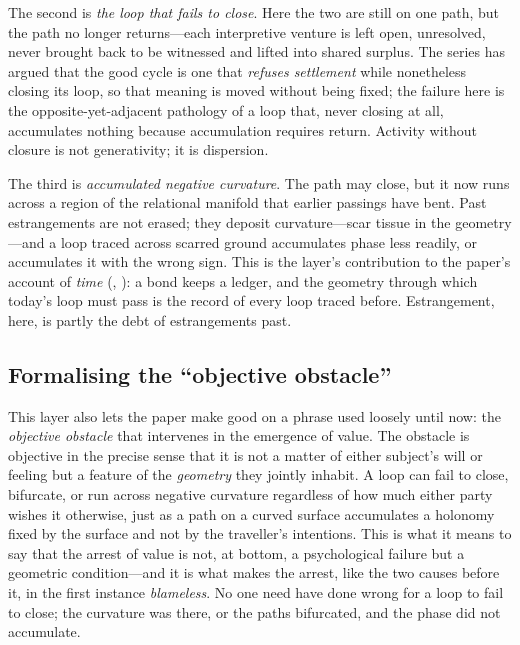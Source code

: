 The second is \emph{the loop that fails to close}. Here the two are still on one path, but the path no longer returns---each interpretive venture is left open, unresolved, never brought back to be witnessed and lifted into shared surplus. The series has argued that the good cycle is one that \emph{refuses settlement} while nonetheless closing its loop, so that meaning is moved without being fixed; the failure here is the opposite-yet-adjacent pathology of a loop that, never closing at all, accumulates nothing because accumulation requires return. Activity without closure is not generativity; it is dispersion.

The third is \emph{accumulated negative curvature}. The path may close, but it now runs across a region of the relational manifold that earlier passings have bent. Past estrangements are not erased; they deposit curvature---scar tissue in the geometry---and a loop traced across scarred ground accumulates phase less readily, or accumulates it with the wrong sign. This is the layer's contribution to the paper's account of \emph{time} (, ): a bond keeps a ledger, and the geometry through which today's loop must pass is the record of every loop traced before. Estrangement, here, is partly the debt of estrangements past.

\subsection{Formalising the ``objective obstacle''}
\label{p17:sub:phase-obstacle}

This layer also lets the paper make good on a phrase used loosely until now: the \emph{objective obstacle} that intervenes in the emergence of value. The obstacle is objective in the precise sense that it is not a matter of either subject's will or feeling but a feature of the \emph{geometry} they jointly inhabit. A loop can fail to close, bifurcate, or run across negative curvature regardless of how much either party wishes it otherwise, just as a path on a curved surface accumulates a holonomy fixed by the surface and not by the traveller's intentions. This is what it means to say that the arrest of value is not, at bottom, a psychological failure but a geometric condition---and it is what makes the arrest, like the two causes before it, in the first instance \emph{blameless}. No one need have done wrong for a loop to fail to close; the curvature was there, or the paths bifurcated, and the phase did not accumulate.

